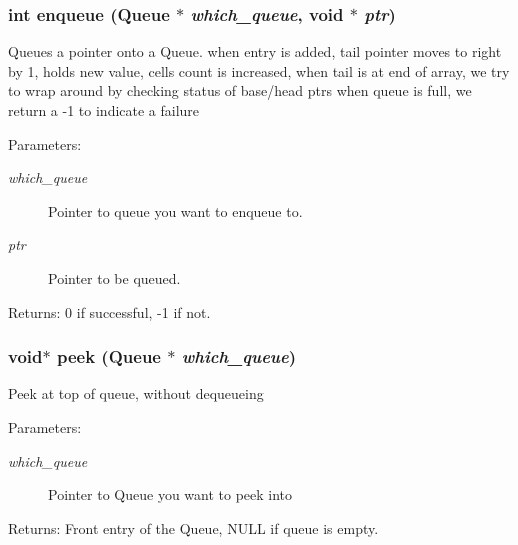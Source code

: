\subsubsection{\setlength{\rightskip}{0pt plus 5cm}int enqueue (\bf{Queue} $\ast$ {\em which\_\-queue}, void $\ast$ {\em ptr})}\label{queue_8c_b5f34276406bb4ca11d16f5d4c608b33}


Queues a pointer onto a Queue. when entry is added, tail pointer moves to right by 1, holds new value, cells count is increased, when tail is at end of array, we try to wrap around by checking status of base/head ptrs when queue is full, we return a -1 to indicate a failure

\begin{Desc}
\item[Parameters:]
\begin{description}
\item[{\em which\_\-queue}]Pointer to queue you want to enqueue to. \item[{\em ptr}]Pointer to be queued. \end{description}
\end{Desc}
\begin{Desc}
\item[Returns:]0 if successful, -1 if not. \end{Desc}
\subsubsection{\setlength{\rightskip}{0pt plus 5cm}void$\ast$ peek (\bf{Queue} $\ast$ {\em which\_\-queue})}\label{queue_8c_16e4ef63ba66115658c75aa206c8977a}


Peek at top of queue, without dequeueing \begin{Desc}
\item[Parameters:]
\begin{description}
\item[{\em which\_\-queue}]Pointer to Queue you want to peek into \end{description}
\end{Desc}
\begin{Desc}
\item[Returns:]Front entry of the Queue, NULL if queue is empty. \end{Desc}
